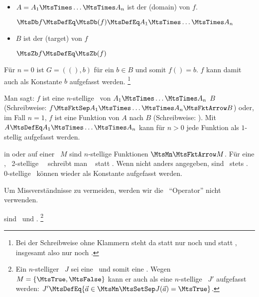 \begin{description}
\begin{itemize}
		$f\vec{a} \MtsDefEq f a_1 \dots a_n \MtsDefEq f(\vec{a}) \MtsDefEq f(a_1,\dots,a_n) \MtsDefEq b$
		\footnote{%
			$f(a_1,\dots,a_n)$ und $f(a_1,\dots,a_n,b)$ sind wohl zu unterscheiden.
			Ersteres ist ein Funktionsaufruf mit einem Funktionswert, letzteres eine Relation mit einem Wahrheitswert.
		}

		\item $A = A_1 \MtsTimes \dots \MtsTimes A_n$ ist der  (domain) von $f$.

		$\MtsDb f \MtsDefEq \MtsDb(f) \MtsDefEq A_1 \MtsTimes \dots \MtsTimes A_n$

		\item $B$ ist der  (target) von $f$

		$\MtsZb f \MtsDefEq \MtsZb(f)$
	\end{itemize}
	Für $n = 0$ ist $G = ((),b)$ für ein $b \in B$ und somit $f() = b$.
	$f$ kann damit auch als Konstante $b$ aufgefasst werden.%
	\footnote{%
		Bei der Schreibweise ohne Klammern steht da statt  nur noch  und statt , insgesamt also nur noch .
	}

	Man sagt: $f$ ist eine $n$-stellige \Funktion\ von $A_1 \MtsTimes \dots \MtsTimes A_n$  $B$ (Schreibweise: $\FunktionDef{f}{A_1 \MtsTimes \dots \MtsTimes A_n}{B}$) oder, im Fall $n=1$, $f$ ist eine Funktion von $A$ nach $B$ (Schreibweise: ).
	Mit $A \MtsDefEq A_1 \MtsTimes \dots \MtsTimes A_n$ kann für $n > 0$ jede Funktion als $1$-stellig aufgefasst werden.

	\item [\Operationen] in oder auf einer \Menge\ $M$ sind $n$-stellige Funktionen $\MtsMn \MtsFktArrow M$.
	Für eine , \textdh\ 2-stellige \Operation\ \BspOpB\ schreibt man \textiAlg\  statt .
	Wenn nicht anders angegeben, sind \Operationen\ stets \binaer.
	0-stellige \Operationen\ können wieder als Konstante aufgefasst werden.

	Um Missverständnisse zu vermeiden, werden wir die \Bezeichnung\ "`Operator"' nicht verwenden.

	\item [\Junktoren] sind \aussagenlogischeRelationen\ und \aOperationen.%
	\footnote{\label{def:Junktor}%
		Ein $n$-stelliger \Junktor\ $J$ sei eine \Operation\ und somit eine \Funktion.
		Wegen $M = \{\MtsTrue,\MtsFalse\}$ kann er auch als eine $n$-stellige \Relation\ $J'$ aufgefasst werden:
		$J' \MtsDefEq \MengeDef{\vec{a} \in \MtsMn}{J(\vec{a}) = \MtsTrue}$.

}
\end{description}
